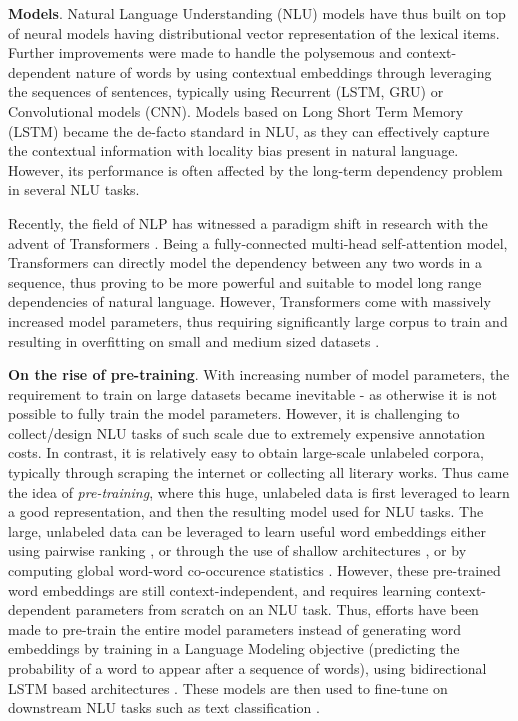 \documentclass[12pt]{article}
\newcommand{\xhdr}[1]{{\noindent\bfseries #1}.}
\begin{document}
\xhdr{Models} Natural Language Understanding (NLU) models have thus built on top of neural models having distributional vector representation of the lexical items. Further improvements were made to handle the polysemous and context-dependent nature of words by using contextual embeddings through leveraging the sequences of sentences, typically using Recurrent (LSTM, GRU) or Convolutional models (CNN). Models based on Long Short Term Memory (LSTM) became the de-facto standard in NLU, as they can effectively capture the contextual information with locality bias present in natural language. However, its performance is often affected by the long-term dependency problem in several NLU tasks.

Recently, the field of NLP has witnessed a paradigm shift in research with the advent of Transformers \cite{vaswani-etal-2017-attention}. Being a fully-connected multi-head self-attention model, Transformers can directly model the dependency between any two words in a sequence, thus proving to be more powerful and suitable to model long range dependencies of natural language. However, Transformers come with massively increased model parameters, thus requiring significantly large corpus to train and resulting in overfitting on small and medium sized datasets \cite{radford2018improving}.

\xhdr{On the rise of pre-training} With increasing number of model parameters, the requirement to train on large datasets became inevitable - as otherwise it is not possible to fully train the model parameters. However, it is challenging to collect/design NLU tasks of such scale due to extremely expensive annotation costs. In contrast, it is relatively easy to obtain large-scale unlabeled corpora, typically through scraping the internet or collecting all literary works. Thus came the idea of \textit{pre-training}, where this huge, unlabeled data is first leveraged to learn a good representation, and then the resulting model used for NLU tasks. The large, unlabeled data can be leveraged to learn useful word embeddings either using pairwise ranking \cite{collobert2008unified}, or through the use of shallow architectures \cite{mikolov2013efficient}, or by computing global word-word co-occurence statistics \cite{pennington2014glove}. However, these pre-trained word embeddings are still context-independent, and requires learning context-dependent parameters from scratch on an NLU task. Thus, efforts have been made to pre-train the entire model parameters instead of generating word embeddings by training in a Language Modeling objective (predicting the probability of a word to appear after a sequence of words), using bidirectional LSTM based architectures \cite{peters2018deep}. These models are then used to fine-tune on downstream NLU tasks such as text classification \cite{howard2018universal}.
\end{document}
